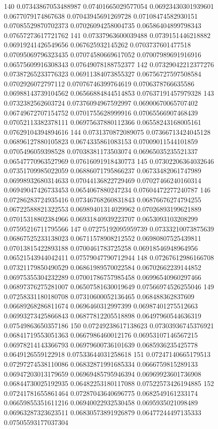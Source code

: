 140 0.07343867053488987 0.07401665029577054 0.06923430301939601 0.0677079174867638 0.07043945691269728 0.07108474582930151 0.07085529870702373 0.07026094258004735 0.06586404899798343 0.07657273617721762
141 0.07337963600039488 0.0739151446218882 0.06919241426549656 0.067625932145262 0.0703737601477518 0.07095069796323435 0.07074580669617052 0.07007989691916916 0.06575609916308343 0.07649078188752377
142 0.07329042212377276 0.07387265233776323 0.06911384073855327 0.06756727597508584 0.0702926072797112 0.07076746399764619 0.0706378766635586 0.06988143739104562 0.06566884844514853 0.07637191457979328
143 0.0732382562603724 0.07376094967592997 0.06900670065707402 0.06749672707154752 0.0701755628999916 0.07065566907468439 0.07052113382378111 0.06975637880112366 0.06558243168005161 0.07629104394894616
144 0.0731370872089075 0.07366713424045128 0.06896127880105823 0.0674335861083153 0.07009011544101859 0.0705496059398528 0.07038381173503074 0.06965035235521337 0.06547770963527969 0.07616091918430773
145 0.07302206364032646 0.07351709985022059 0.06886071795866237 0.06733482061747989 0.06998932680314633 0.07044136822729469 0.07027466240160314 0.06949047426733453 0.0654067880247234 0.07604472277240787
146 0.07286283724935416 0.07346768260831843 0.06876676274794255 0.06722588821322553 0.06989401314029962 0.07026893199621889 0.07015318802384966 0.06931840939223707 0.0653093103208299 0.07595216711795566
147 0.07275192095959739 0.07333210073875639 0.06867525233138023 0.06711578908212552 0.06980807525439811 0.07013815422893188 0.0700461783725258 0.06918546948964956 0.06521543944042411 0.07579047790712944
148 0.07267612986166708 0.07321179850490529 0.06861989570022584 0.06702662239144852 0.06975355304232289 0.07001786757985458 0.06996540960297466 0.06897376275281007 0.06507581630019649 0.07566974526255046
149 0.07258331180180708 0.07310600052136465 0.068488362837609 0.06689268286811674 0.0696460312997399 0.06987401275512663 0.06993273425866843 0.06877812205518898 0.06497960544636319 0.07549863650357186
150 0.07249238617138623 0.07303936745376921 0.06841719553051363 0.0667986460012176 0.06953107146567215 0.06978214143366793 0.06979600736101639 0.0685936235425778 0.0649126559122918 0.07533644031258618
151 0.07247140665179513 0.07297274538110086 0.06832871991685334 0.0666759815289133 0.06947203013179659 0.06969485795946394 0.06969923601736908 0.06844730025192935 0.06482253180117088 0.07522573426194885
152 0.07241781655861464 0.07287043640696775 0.0682549161233174 0.06659855351611216 0.06940022932530458 0.0695935021098489 0.06963287323623511 0.06830573891926879 0.06477244497135333 0.07505593177037304
